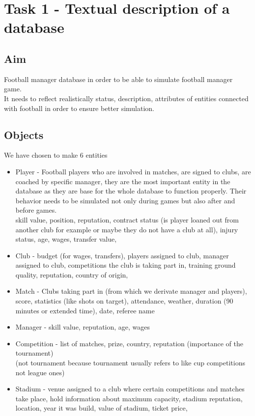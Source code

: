 \documentclass{report}
\begin{document}
\chapter{Task 1 - Textual description of a database}
\section{Aim}

Football manager database in order to be able to simulate football manager game. \\ 
It needs to reflect realistically status, description, attributes of entities connected with football in order to ensure better simulation. \\ 


\section{Objects}  \label{Objects Section}
We have chosen to make 6 entities \\ 
\begin{itemize}
    \item Player - Football players who are involved in matches, are signed to clubs, are coached by specific manager, they are the most important entity in the database as they are base for the whole database to function properly. Their behavior needs to be simulated not only during games but also after and before games.\\
    skill value, position, reputation, contract status (is player loaned out from another club for example or maybe they do not have a club at all), injury status, age, wages, transfer value, 
    \item Club - budget (for wages, transfers), players assigned to club, manager assigned to club, competitions the club is taking part in, training ground quality, reputation, country of origin,
    \item Match - Clubs taking part in (from which we derivate manager and players), score, statistics (like shots on target), attendance, weather, duration (90 minutes or extended time), date, referee name
    \item Manager - skill value, reputation, age, wages
    \item Competition - list of matches, prize, country, reputation (importance of the tournament)\\
    (not tournament because tournament usually refers to like cup competitions not league ones)
    \item Stadium - venue assigned to a club where certain competitions and matches take place, hold information about maximum capacity, stadium reputation, location, year it was build, value of stadium, ticket price, 
\end{itemize} 
\end{document}
